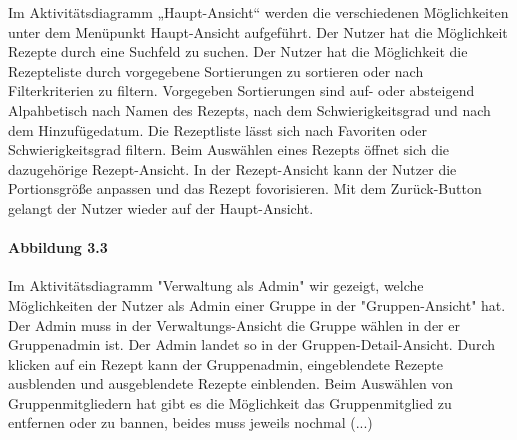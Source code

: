 \documentclass[parskip=full]{scrartcl}
\begin{document}
Im Aktivitätsdiagramm „Haupt-Ansicht“ werden die verschiedenen Möglichkeiten unter dem Menüpunkt Haupt-Ansicht aufgeführt.
Der Nutzer hat die Möglichkeit Rezepte durch eine Suchfeld zu suchen.
Der Nutzer hat die Möglichkeit die Rezepteliste durch vorgegebene Sortierungen zu sortieren oder nach Filterkriterien zu filtern.
Vorgegeben Sortierungen sind auf- oder absteigend Alpahbetisch nach Namen des Rezepts, nach dem Schwierigkeitsgrad und nach dem Hinzufügedatum.
Die Rezeptliste lässt sich nach Favoriten oder Schwierigkeitsgrad filtern.
Beim Auswählen eines Rezepts öffnet sich die dazugehörige Rezept-Ansicht.
In der Rezept-Ansicht kann der Nutzer die Portionsgröße anpassen und das Rezept fovorisieren.
Mit dem Zurück-Button gelangt der Nutzer wieder auf der Haupt-Ansicht.\par


\paragraph{Abbildung 3.3}

Im Aktivitätsdiagramm "Verwaltung als Admin" wir gezeigt, welche Möglichkeiten der Nutzer als Admin einer Gruppe in der "Gruppen-Ansicht" hat.
Der Admin muss in der Verwaltungs-Ansicht die Gruppe wählen in der er Gruppenadmin ist.
Der Admin landet so in der Gruppen-Detail-Ansicht.
Durch klicken auf ein Rezept kann der Gruppenadmin, eingeblendete Rezepte ausblenden und ausgeblendete Rezepte einblenden.
Beim Auswählen von Gruppenmitgliedern hat gibt es die Möglichkeit das Gruppenmitglied zu entfernen oder zu bannen, beides muss jeweils nochmal (...)
\newpage
\end{document}
